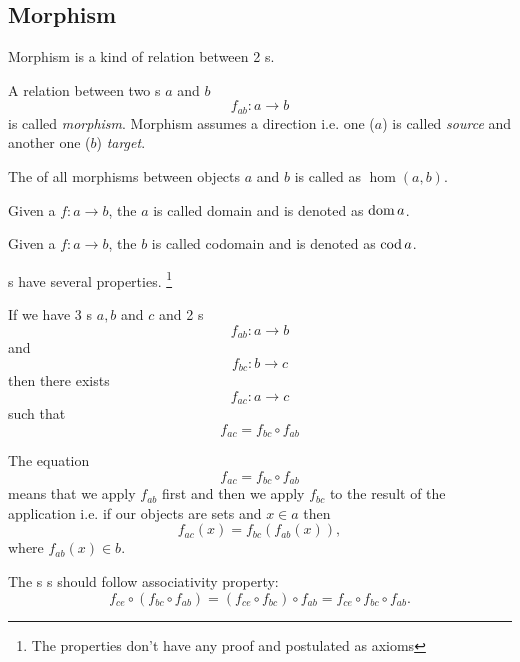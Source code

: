 \subsection{Morphism}
Morphism is a kind of relation between 2 s. 
\begin{definition}[Morphism]
  \label{def:morphism}
  A relation between two s $a$ and $b$ 
  \[
  f_{ab}: a \rightarrow b
  \]
  is called
  \textit{morphism}. Morphism assumes a direction i.e. one 
  ($a$) is called \textit{source} and another one ($b$)
  \textit{target}.

  The  of all morphisms between objects $a$ and $b$
  is called as $\hom\left(a, b\right)$.
\end{definition}

\begin{definition}[Domain]
  \label{def:domain}
  Given a  $f: a \to b$, the
   $a$ is called domain and is denoted as $\operatorname{dom} a$.
\end{definition}

\begin{definition}[Codomain]
  \label{def:codomain}
  Given a  $f: a \to b$, the
   $b$ is called codomain and is denoted as $\operatorname{cod} a$.
\end{definition}

s have several properties. \footnote{The
  properties don't have any proof and postulated as axioms}
\begin{axiom}[Composition]
  \label{axm:composition}
  If we have 3 s $a, b$ and $c$ and 2
  s 
  \[
  f_{ab} : a \rightarrow b
  \]
  and 
  \[
  f_{bc} : b \rightarrow c
  \]
  then there exists  
  \[
  f_{ac} : a \rightarrow c
  \]
  such that
  \[
  f_{ac} = f_{bc} \circ f_{ab}
  \]
\end{axiom}

\begin{remark}[Composition]
  \label{rem:composition}
  The equation
  \[
  f_{ac} = f_{bc} \circ f_{ab}
  \]
  means that we apply $f_{ab}$ first and then we apply $f_{bc}$ to the
  result of the application i.e. if our objects are sets and $x \in a$
  then 
  \[
  f_{ac} ( x ) = f_{bc} ( f_{ab} ( x ) ),
  \]
  where $f_{ab} ( x ) \in b$.
\end{remark}

\begin{axiom}[Associativity]
  \label{axm:associativity}
  The s s should
  follow associativity property:
  \[
  f_{ce} \circ (f_{bc} \circ f_{ab}) = (f_{ce} \circ f_{bc}) \circ
  f_{ab} = f_{ce} \circ f_{bc} \circ f_{ab}.
  \]
\end{axiom}


